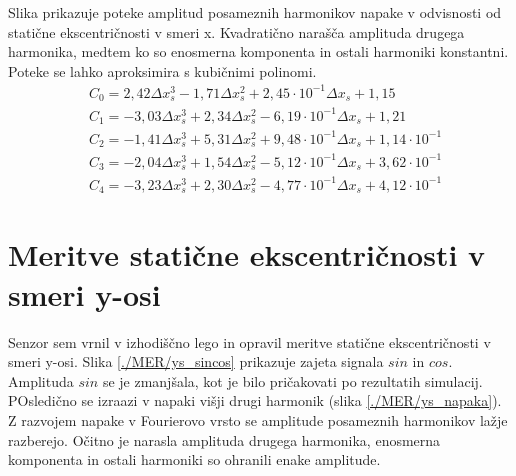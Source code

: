 Slika prikazuje poteke amplitud posameznih harmonikov napake v odvisnosti od statične ekscentričnosti v smeri x. Kvadratično narašča amplituda drugega harmonika, medtem ko so enosmerna komponenta in ostali harmoniki konstantni. Poteke se lahko aproksimira s kubičnimi polinomi.
\begin{eqnarray}
&C_0 =2,42\Delta x_s^{3}-1,71\Delta x_s^{2}+2,45\cdot 10^{-1}\Delta x_s+1,15 \\              
&C_1 =-3,03\Delta x_s^{3}+2,34\Delta x_s^{2}-6,19\cdot 10^{-1}\Delta x_s+1,21 \\             
&C_2 =-1,41\Delta x_s^{3}+5,31\Delta x_s^{2}+9,48\cdot 10^{-1}\Delta x_s+1,14\cdot 10^{-1} \\
&C_3 =-2,04\Delta x_s^{3}+1,54\Delta x_s^{2}-5,12\cdot 10^{-1}\Delta x_s+3,62\cdot 10^{-1} \\
&C_4 =-3,23\Delta x_s^{3}+2,30\Delta x_s^{2}-4,77\cdot 10^{-1}\Delta x_s+4,12\cdot 10^{-1}
\end{eqnarray}






\newpage
\section{Meritve statične ekscentričnosti v smeri y-osi}
Senzor sem vrnil v izhodiščno lego in opravil meritve statične ekscentričnosti v smeri y-osi. Slika \ref{./MER/ys_sincos} prikazuje zajeta signala $sin$ in $cos$. Amplituda $sin$ se je zmanjšala, kot je bilo pričakovati po rezultatih simulacij. POsledično se izraazi v napaki višji drugi harmonik (slika \ref{./MER/ys_napaka}). Z razvojem napake v Fourierovo vrsto se amplitude posameznih harmonikov lažje razberejo. Očitno je narasla amplituda drugega harmonika, enosmerna komponenta in ostali harmoniki so ohranili enake amplitude.
